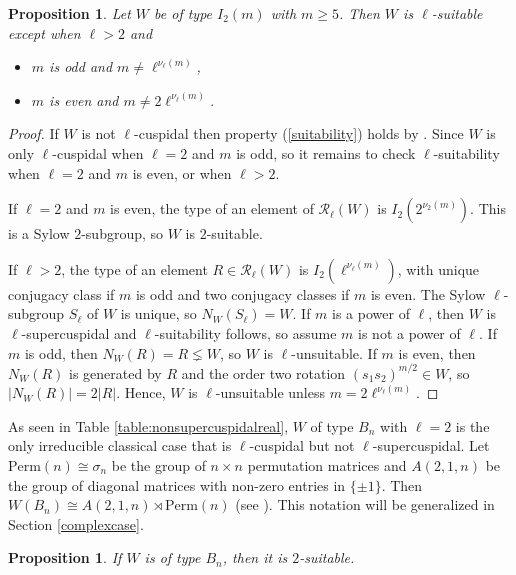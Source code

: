 \documentclass[12pt]{amsart}
\theoremstyle{plain}
\newtheorem{proposition}[theorem]{Proposition}
\theoremstyle{definition}
\numberwithin{equation}{section}
\numberwithin{equation}{section}
\begin{document}
	\begin{proposition}\label{prop:suitabilityofdihedrals}
		Let $W$ be of type $I_2(m)$ with $m\geq 5$. Then $W$ is $\ell$-suitable except when $\ell>2$ and
		\begin{itemize}
			\item[(i)] $m$ is odd and $m\neq \ell^{\nu_\ell(m)}$,
			\item[(ii)] $m$ is even and $m\neq2\ell^{\nu_\ell(m)}$.
		\end{itemize}
	\end{proposition}
	
	\begin{proof}
		If $W$ is not $\ell$-cuspidal then property (\ref{suitability}) holds by \cite[Observation 1.4]{METOO}. Since $W$ is only $\ell$-cuspidal when $\ell=2$ and $m$ is odd, so it remains to check $\ell$-suitability when $\ell=2$ and $m$ is even, or when $\ell>2$.
		
		If $\ell=2$ and $m$ is even, the type of an element of $\mathcal{R}_\ell(W)$ is $I_2(2^{\nu_2(m)})$. This is a Sylow $2$-subgroup, so $W$ is $2$-suitable.
		
		If $\ell>2$, the type of an element $R\in\mathcal{R}_\ell(W)$ is $I_2(\ell^{\nu_\ell(m)})$, with unique conjugacy class if $m$ is odd and two conjugacy classes if $m$ is even. The Sylow $\ell$-subgroup $S_\ell$ of $W$ is unique, so $N_W(S_\ell)=W$. If $m$ is a power of $\ell$, then $W$ is $\ell$-supercuspidal and $\ell$-suitability follows, so assume $m$ is not a power of $\ell$. If $m$ is odd, then $N_W(R)=R\lneq W$, so $W$ is $\ell$-unsuitable. If $m$ is even, then $N_W(R)$ is generated by $R$ and the order two rotation $(s_1s_2)^{m/2}\in W$, so $|N_W(R)|=2|R|$. Hence, $W$ is $\ell$-unsuitable unless $m=2\ell^{\nu_\ell(m)}$.
	\end{proof}
	
	As seen in Table \ref{table:nonsupercuspidalreal}, $W$ of type $B_n$ with $\ell=2$ is the only irreducible classical case that is $\ell$-cuspidal but not $\ell$-supercuspidal. Let $\text{Perm}(n)\cong \sigma_n$ be the group of $n\times n$ permutation matrices and $A(2,1,n)$ be the group of diagonal matrices with non-zero entries in $\{\pm 1\}$. Then $W(B_n)\cong A(2,1,n)\rtimes\text{Perm}(n)$ (see \cite[Chap. 2]{GUSTAY}). This notation will be generalized in Section \ref{complexcase}. 
	
	\begin{proposition}\label{prop:suitabilityofbn}
		If $W$ is of type $B_n$, then it is $2$-suitable.	
	\end{proposition}
	
\end{document}

